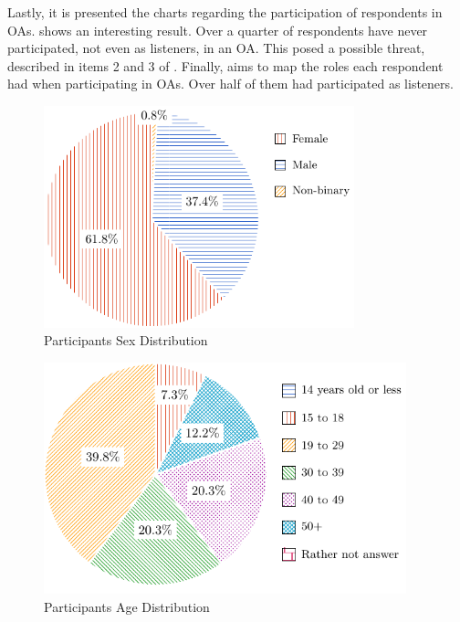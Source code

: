 Lastly, it is presented the charts regarding the participation of respondents in \acp{OA}.  shows an interesting result. Over a quarter of respondents have never participated, not even as listeners, in an \ac{OA}. This posed a possible threat, described in items 2 and 3 of . Finally,  aims to map the roles each respondent had when participating in \acp{OA}. Over half of them had participated as listeners.

\begin{figure}[!htb]
  \caption{Participants Sex Distribution}\label{fig:sex-distribution}
  \begin{center}
    \includegraphics[width=9cm]{img/5-participants-sex.pdf}
  \end{center}
\end{figure}

\begin{figure}[!htb]
  \caption{Participants Age Distribution}\label{fig:age-distribution}
  \begin{center}
    \includegraphics[width=10.5cm]{img/5-participants-age.pdf}
  \end{center}
\end{figure}

